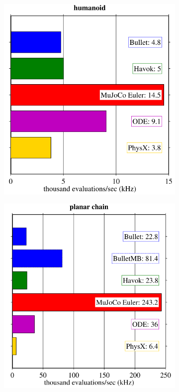 \begin{figure}

    \begin{subfigure}{0.33\textwidth}
      \includegraphics[width=\linewidth]{figures/BulletCom1.png}
      \caption{} \label{fig:1a}
    \end{subfigure}%
    \hspace*{\fill}   %
    \begin{subfigure}{0.33\textwidth}
      \includegraphics[width=\linewidth]{figures/BulletCom2.png}

\end{subfigure}
\end{figure}
